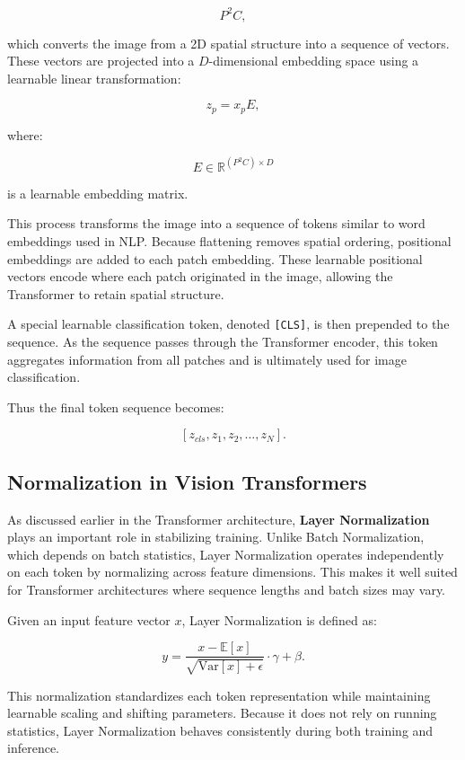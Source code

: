 \documentclass[11pt]{article}
\begin{document}
\[
P^2 C,
\]

which converts the image from a 2D spatial structure into a sequence of vectors. These vectors are projected into a $D$-dimensional embedding space using a learnable linear transformation:

\[
z_p = x_p E,
\]

where:

\[
E \in \mathbb{R}^{(P^2 C)\times D}
\]

is a learnable embedding matrix.

This process transforms the image into a sequence of tokens similar to word embeddings used in NLP. Because flattening removes spatial ordering, positional embeddings are added to each patch embedding. These learnable positional vectors encode where each patch originated in the image, allowing the Transformer to retain spatial structure.

A special learnable classification token, denoted \texttt{[CLS]}, is then prepended to the sequence. As the sequence passes through the Transformer encoder, this token aggregates information from all patches and is ultimately used for image classification.

Thus the final token sequence becomes:

\[
[z_{cls}, z_1, z_2, \dots , z_N].
\]

\subsection{Normalization in Vision Transformers}

As discussed earlier in the Transformer architecture, \textbf{Layer Normalization} plays an important role in stabilizing training. Unlike Batch Normalization, which depends on batch statistics, Layer Normalization operates independently on each token by normalizing across feature dimensions. This makes it well suited for Transformer architectures where sequence lengths and batch sizes may vary.

Given an input feature vector $x$, Layer Normalization is defined as:

\[
y =
\frac{x-\mathbb{E}[x]}
{\sqrt{\text{Var}[x]+\epsilon}}
\cdot \gamma + \beta.
\]

This normalization standardizes each token representation while maintaining learnable scaling and shifting parameters. Because it does not rely on running statistics, Layer Normalization behaves consistently during both training and inference.
\end{document}
